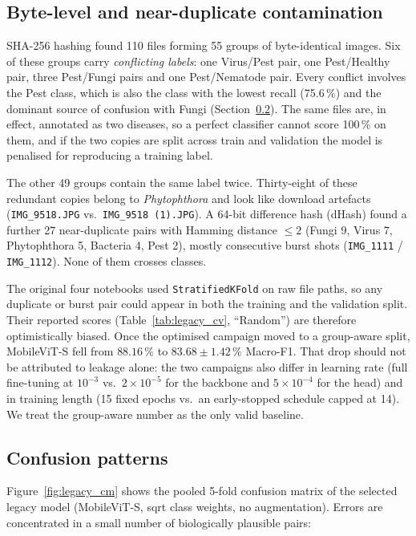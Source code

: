 \subsection{Byte-level and near-duplicate contamination}
\label{sec:audit_duplicates}

SHA-256 hashing found 110 files forming 55 groups of byte-identical images.
Six of these groups carry \emph{conflicting labels}: one Virus/Pest pair, one
Pest/Healthy pair, three Pest/Fungi pairs and one Pest/Nematode pair. Every
conflict involves the Pest class, which is also the class with the lowest
recall (75.6\,\%) and the dominant source of confusion with Fungi
(Section~\ref{sec:audit_confusion}). The same files are, in effect, annotated as
two diseases, so a perfect classifier cannot score 100\,\% on them, and if the
two copies are split across train and validation the model is penalised for
reproducing a training label.

The other 49 groups contain the same label twice. Thirty-eight of these
redundant copies belong to \emph{Phytophthora} and look like download artefacts
(\texttt{IMG\_9518.JPG} vs.\ \texttt{IMG\_9518 (1).JPG}). A 64-bit difference hash
(dHash) found a further 27 near-duplicate pairs with Hamming distance $\le 2$
(Fungi 9, Virus 7, Phytophthora 5, Bacteria 4, Pest 2), mostly consecutive burst
shots (\texttt{IMG\_1111} / \texttt{IMG\_1112}). None of them crosses classes.

The original four notebooks used \texttt{StratifiedKFold} on raw file paths, so
any duplicate or burst pair could appear in both the training and the validation
split. Their reported scores (Table~\ref{tab:legacy_cv}, ``Random'') are therefore
optimistically biased. Once the optimised campaign moved to a group-aware split,
MobileViT-S fell from $88.16\,\%$ to $83.68 \pm 1.42\,\%$ Macro-F1. That drop
should not be attributed to leakage alone: the two campaigns also differ in
learning rate (full fine-tuning at $10^{-3}$ vs.\ $2\!\times\!10^{-5}$ for the
backbone and $5\!\times\!10^{-4}$ for the head) and in training length (15 fixed
epochs vs.\ an early-stopped schedule capped at 14). We treat the group-aware
number as the only valid baseline.



\subsection{Confusion patterns}
\label{sec:audit_confusion}

Figure~\ref{fig:legacy_cm} shows the pooled 5-fold confusion matrix of the
selected legacy model (MobileViT-S, sqrt class weights, no augmentation). Errors
are concentrated in a small number of biologically plausible pairs:

